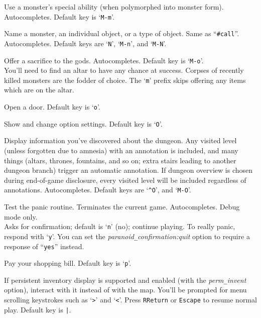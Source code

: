 \item[\tb{\#monster}]
Use a monster's special ability (when polymorphed into monster form).
Autocompletes. Default key is `{\tt M-m}'.
\item[\tb{\#name}]
Name a monster, an individual object, or a type of object.
Same as ``{\tt \#call}''.
Autocompletes.
Default keys are `{\tt N}', `{\tt M-n}', and `{\tt M-N}'.
\item[\tb{\#offer}]
Offer a sacrifice to the gods. Autocompletes. Default key is `{\tt M-o}'.\\
You'll need to find an altar to have any chance at success.
Corpses of recently killed monsters are the fodder of choice.
The `{\tt m}' prefix skips offering any items which are on the altar.\\
\item[\tb{\#open}]
Open a door. Default key is `{\tt o}'.
\item[\tb{\#options}]
Show and change option settings. Default key is `{\tt O}'.
\item[\tb{\#overview}]
Display information you've discovered about the dungeon.  Any visited
level (unless forgotten due to amnesia) with an annotation is included,
and many things (altars, thrones, fountains, and so on; extra stairs
leading to another dungeon branch) trigger an automatic annotation.
If dungeon overview is chosen during end-of-game disclosure, every visited
level will be included regardless of annotations. Autocompletes.
Default keys are `{\tt \^{}O}', and `{\tt M-O}'.
\item[\tb{\#panic}]
Test the panic routine.
Terminates the current game.
Autocompletes.
Debug mode only.\\
Asks for confirmation; default is `{\tt n}' (no); continue playing.
To really panic, respond with `{\tt y}'.
You can set the
{\it paranoid\verb+_+confirmation:quit\/}
option to require a response of ``{\tt yes}'' instead.
\item[\tb{\#pay}]
Pay your shopping bill. Default key is `{\tt p}'.
\item[\tb{\#perminv}]
If persistent inventory display is supported and enabled (with the
{\it perm\verb+_+invent\/} option), interact with it instead of with the map.
You'll be prompted for menu scrolling keystrokes such
as `{\tt \verb+>+}' and `{\tt \verb+<+}'.
Press {\tt RReturn} or {\tt Escape} to resume normal play.
Default key is {\tt \verb+|+}.
\item[\tb{\#pickup}]
